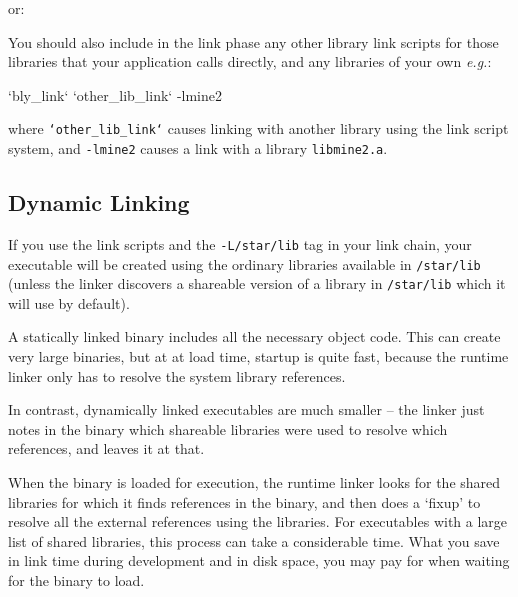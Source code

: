 \documentclass[twoside,11pt,nolof]{starlink}
\begin{document}
\begin{terminalv}
\end{terminalv}
or:
\begin{terminalv}
\end{terminalv}

You should also include in the link phase any other library link scripts
for those libraries that your application calls directly, and any
libraries of your own \emph{e.g.}:

\begin{terminalv}
         `bly_link` `other_lib_link` -lmine2
\end{terminalv}

where \texttt{`other\_lib\_link`} causes linking with another library
using the link script system, and \texttt{-lmine2} causes a link with a
library \texttt{libmine2.a}.

\subsection{Dynamic Linking}
\label{dynamic_linking}

If you use the link scripts and the \texttt{-L/star/lib} tag in your link
chain, your executable will be created using the ordinary libraries
available in \texttt{/star/lib} (unless the linker discovers a shareable
version of a library in \texttt{/star/lib} which it will use by default).

A statically linked binary includes all the necessary object code.  This
can create very large binaries, but at at load time, startup is quite
fast, because the runtime linker only has to resolve the system library
references.

In contrast, dynamically linked executables are much smaller -- the
linker just notes in the binary which shareable libraries were used to
resolve which references, and leaves it at that.

When the binary is loaded for execution, the runtime linker looks for the
shared libraries for which it finds references in the binary, and then does a
`fixup' to resolve all the external references using the libraries.  For
executables with a large list of shared libraries, this process can take a
considerable time.  What you save in link time during development and in
disk space, you may pay for when waiting for the binary to load.
\end{document}
